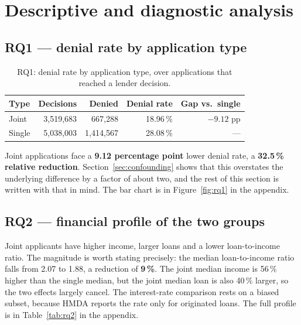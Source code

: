 \documentclass[sigconf,balance=false]{acmart}
\begin{document}


\section{Descriptive and diagnostic analysis}\label{sec:analysis}

\subsection{RQ1 --- denial rate by application type}

\begin{table}[t]
\caption{RQ1: denial rate by application type, over applications that
         reached a lender decision.}
\label{tab:rq1}
\centering
\begin{tabular}{@{}lrrrr@{}}
\toprule
Type & Decisions & Denied & Denial rate & Gap vs.\ single \\
\midrule
Joint  & 3{,}519{,}683 &   667{,}288 & 18.96\,\% & $-9.12$ pp \\
Single & 5{,}038{,}003 & 1{,}414{,}567 & 28.08\,\% & --- \\
\bottomrule
\end{tabular}
\end{table}

Joint applications face a \textbf{9.12 percentage point} lower denial rate,
a \textbf{32.5\,\% relative reduction}. Section~\ref{sec:confounding} shows
that this overstates the underlying difference by a factor of about two,
and the rest of this section is written with that in mind. The bar chart is
in Figure~\ref{fig:rq1} in the appendix.


\subsection{RQ2 --- financial profile of the two groups}

Joint applicants have higher income, larger loans and a lower
loan-to-income ratio. The magnitude is worth stating precisely: the median
loan-to-income ratio falls from 2.07 to 1.88, a reduction of \textbf{9\,\%}.
The joint median income is 56\,\% higher than the single median, but the
joint median loan is also 40\,\% larger, so the two effects largely
cancel. The interest-rate comparison rests on a biased subset, because HMDA
reports the rate only for originated loans. The full profile is in
Table~\ref{tab:rq2} in the appendix.
\end{document}
